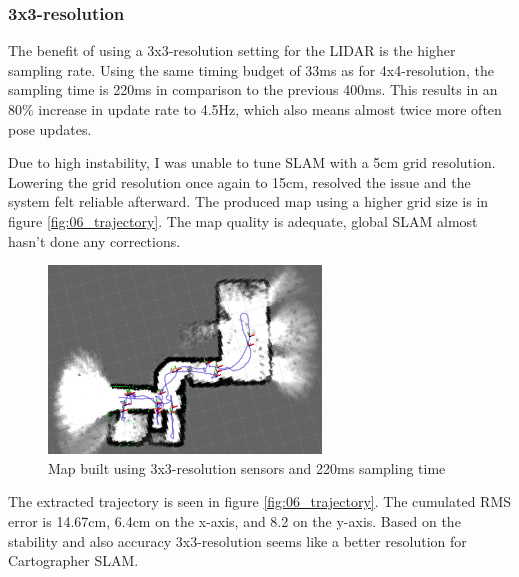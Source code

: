 \subsubsection{3x3-resolution}
The benefit of using a 3x3-resolution setting for the LIDAR is the higher sampling rate. Using the
same timing budget of 33ms as for 4x4-resolution, the sampling time is 220ms in comparison to the
previous 400ms. This results in an 80\% increase in update rate to 4.5Hz, which also means almost twice
more often pose updates.

Due to high instability, I was unable to tune SLAM with a 5cm grid resolution. Lowering the grid
resolution once again to 15cm, resolved the issue and the system felt reliable afterward. The
produced map using a higher grid size is in figure \ref{fig:06_trajectory}. The map quality is
adequate, global SLAM almost hasn't done any corrections.


\begin{figure}[!h]
    \centering
	\includegraphics[height=50mm, keepaspectratio]{figures/06_map.png}
    \caption{Map built using 3x3-resolution sensors and 220ms sampling time}
    \label{fig:06_map}
\end{figure}

The extracted trajectory is seen in figure \ref{fig:06_trajectory}. The cumulated RMS error is
14.67cm, 6.4cm on the x-axis, and 8.2 on the y-axis. Based on the stability and also accuracy 3x3-resolution
seems like a better resolution for Cartographer SLAM.


